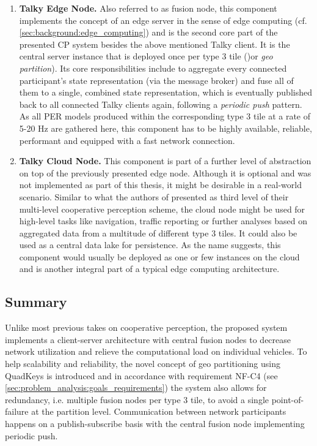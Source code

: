 \begin{enumerate}[C1: ]
	\item \textbf{Talky Edge Node.} Also referred to as fusion node, this component implements the concept of an edge server in the sense of edge computing (cf. \cref{sec:background:edge_computing}) and is the second core part of the presented CP system besides the above mentioned Talky client. It is the central server instance that is deployed once per type 3 tile ()or \textit{geo partition}). Its core responsibilities include to aggregate every connected participant's state representation (via the message broker) and fuse all of them to a single, combined state representation, which is eventually published back to all connected Talky clients again, following a \textit{periodic push} pattern. As all PER models produced within the corresponding type 3 tile at a rate of 5-20 \si{\hertz} are gathered here, this component has to be highly available, reliable, performant and equipped with a fast network connection.
	\item \textbf{Talky Cloud Node.} This component is part of a further level of abstraction on top of the previously presented edge node. Although it is optional and was not implemented as part of this thesis, it might be desirable in a real-world scenario. Similar to what the authors of \cite{Calvo2017} presented as third level of their multi-level cooperative perception scheme, the cloud node might be used for high-level tasks like navigation, traffic reporting or further analyses based on aggregated data from a multitude of different type 3 tiles. It could also be used as a central data lake for persistence. As the name suggests, this component would usually be deployed as one or few instances on the cloud and is another integral part of a typical edge computing architecture. 
\end{enumerate}

\subsection{Summary}
\label{subsec:concept_design:summary}
Unlike most previous takes on cooperative perception, the proposed system implements a client-server architecture with central fusion nodes to decrease network utilization and relieve the computational load on individual vehicles. To help scalability and reliability, the novel concept of geo partitioning using QuadKeys is introduced and in accordance with requirement NF-C4 (see \cref{sec:problem_analysis:goals_requirements}) the system also allows for redundancy, i.e. multiple fusion nodes per type 3 tile, to avoid a single point-of-failure at the partition level. Communication between network participants happens on a publish-subscribe basis with the central fusion node implementing periodic push.

